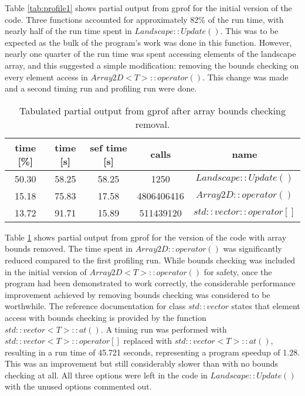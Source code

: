 Table \ref{tab:profile1} shows partial output from gprof for the initial version of the code.
Three functions accounted for approximately 82\% of the run time, with nearly half of the run time spent in $Landscape::Update()$.
This was to be expected as the bulk of the program's work was done in this function.
However, nearly one quarter of the run time was spent accessing elements of the landscape array, and this suggested a simple modification: removing the bounds checking on every element access in $Array2D<T>::operator()$. 
This change was made and a second timing run and profiling run were done.

\begin{table}[h!]
\caption{Tabulated partial output from gprof after array bounds checking removal.}
\label{tab:profile2}
\begin{center}
\begin{tabular}{|c|c|c|c|c|}
\hline
time [\%] & time [s] & sef time [s] & calls & name\\
\hline
50.30 & 58.25 & 58.25 & 1250 & $Landscape::Update()$\\
\hline
15.18 & 75.83 & 17.58 & 4806406416 & $Array2D::operator()$\\
\hline
13.72 & 91.71 & 15.89 & 511439120 & $std::vector::operator[]$\\
\hline
\end{tabular}
\end{center}
\end{table}

Table \ref{tab:profile2} shows partial output from gprof for the version of the code with array bounds removed.  
The time spent in $Array2D::operator()$ was significantly reduced compared to the first profiling run.  
While bounds checking was included in the initial version of $Array2D<T>::operator()$ for safety, once the program had been demonstrated to work correctly, the considerable performance improvement achieved by removing bounds checking was considered to be worthwhile.
The reference documentation for class $std::vector$ states that element access with bounds checking is provided by the function $std::vector<T>::at()$.
A timing run was performed with $std::vector<T>::operator[]$ replaced with $std::vector<T>::at()$, resulting in a run time of 45.721 seconds, representing a program speedup of 1.28.
This was an improvement but still considerably slower than with no bounds checking at all. 
All three options were left in the code in $Landscape::Update()$ with the unused options commented out.

